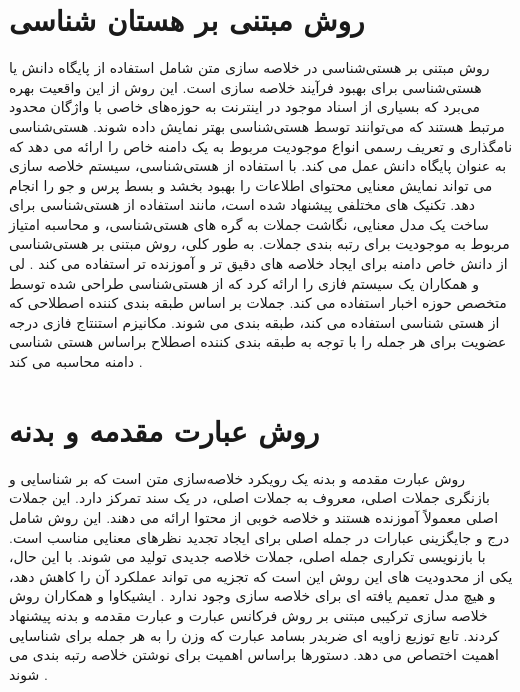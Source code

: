 \section{روش مبتنی بر هستان شناسی}
روش مبتنی بر هستی‌شناسی در خلاصه سازی متن شامل استفاده از پایگاه دانش یا هستی‌شناسی برای بهبود فرآیند خلاصه سازی است. این روش از این واقعیت بهره می‌برد که بسیاری از اسناد موجود در اینترنت به حوزه‌های خاصی با واژگان محدود مرتبط هستند که می‌توانند توسط هستی‌شناسی بهتر نمایش داده شوند. هستی‌شناسی نامگذاری و تعریف رسمی انواع موجودیت مربوط به یک دامنه خاص را ارائه می دهد که به عنوان پایگاه دانش عمل می کند. با استفاده از هستی‌شناسی، سیستم خلاصه سازی می تواند نمایش معنایی محتوای اطلاعات را بهبود بخشد و بسط پرس و جو را انجام دهد. تکنیک های مختلفی پیشنهاد شده است، مانند استفاده از هستی‌شناسی برای ساخت یک مدل معنایی، نگاشت جملات به گره های هستی‌شناسی، و محاسبه امتیاز مربوط به موجودیت برای رتبه بندی جملات. به طور کلی، روش مبتنی بر هستی‌شناسی از دانش خاص دامنه برای ایجاد خلاصه های دقیق تر و آموزنده تر استفاده می کند
\cite{andhale2016overview}.
لی و همکاران  یک سیستم فازی را ارائه کرد که از هستی‌شناسی طراحی شده توسط متخصص حوزه اخبار استفاده می کند. جملات بر اساس طبقه بندی کننده اصطلاحی که از هستی شناسی استفاده می کند، طبقه بندی می شوند. مکانیزم استنتاج فازی درجه عضویت برای هر جمله را با توجه به طبقه بندی کننده اصطلاح براساس هستی شناسی دامنه محاسبه می کند
\cite{lee2005fuzzy}.

\section{روش  عبارت مقدمه و بدنه}

روش عبارت مقدمه و بدنه یک رویکرد خلاصه‌سازی متن است که بر شناسایی و بازنگری جملات اصلی، معروف به جملات اصلی، در یک سند تمرکز دارد. این جملات اصلی معمولاً آموزنده هستند و خلاصه خوبی از محتوا ارائه می دهند. این روش شامل درج و جایگزینی عبارات در جمله اصلی برای ایجاد تجدید نظرهای معنایی مناسب است. با بازنویسی تکراری جمله اصلی، جملات خلاصه جدیدی تولید می شوند. با این حال، یکی از محدودیت های این روش این است که تجزیه می تواند عملکرد آن را کاهش دهد، و هیچ مدل تعمیم یافته ای برای خلاصه سازی وجود ندارد
\cite{andhale2016overview}.
ایشیکاوا و همکاران  روش خلاصه سازی ترکیبی مبتنی بر روش فرکانس عبارت
 و عبارت مقدمه و بدنه پیشنهاد کردند. تابع توزیع زاویه ای ضربدر بسامد عبارت که وزن را به هر جمله برای شناسایی اهمیت اختصاص می دهد. دستورها براساس اهمیت برای نوشتن خلاصه رتبه بندی می شوند
\cite{Ishikawa2001HybridTS}.

